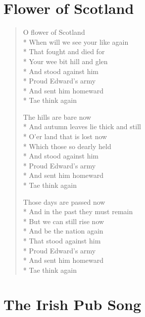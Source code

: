 \documentclass[9pt,twoside]{extarticle}
\newenvironment{xverse}{
	\begin{verse}
	\fontsize{8.5}{10.5}\selectfont
}{
	\end{verse}
}
\begin{document}
\section{Flower of Scotland}

\begin{xverse}
O flower of Scotland \\*
When will we see your like again \\*
That fought and died for \\*
Your wee bit hill and glen \\*
And stood against him \\*
Proud Edward’s army \\*
And sent him homeward \\*
Tae think again

The hills are bare now \\*
And autumn leaves lie thick and still \\*
O’er land that is lost now \\*
Which those so dearly held \\*
And stood against him \\*
Proud Edward’s army \\*
And sent him homeward \\*
Tae think again

Those days are passed now \\*
And in the past they must remain \\*
But we can still rise now \\*
And be the nation again \\*
That stood against him \\*
Proud Edward’s army \\*
And sent him homeward \\*
Tae think again
\end{xverse}


\section{The Irish Pub Song}
\end{document}
